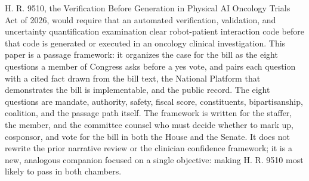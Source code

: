 H. R. 9510, the Verification Before Generation in Physical AI Oncology Trials Act
of 2026, would require that an automated verification, validation, and uncertainty
quantification examination clear robot-patient interaction code before that code is
generated or executed in an oncology clinical investigation. This paper is a
passage framework: it organizes the case for the bill as the eight questions a
member of Congress asks before a yes vote, and pairs each question with a cited
fact drawn from the bill text, the National Platform that demonstrates the bill is
implementable, and the public record. The eight questions are mandate, authority,
safety, fiscal score, constituents, bipartisanship, coalition, and the passage path
itself. The framework is written for the staffer, the member, and the committee
counsel who must decide whether to mark up, cosponsor, and vote for the bill in both
the House and the Senate. It does not rewrite the prior narrative review or the
clinician confidence framework; it is a new, analogous companion focused on a single
objective: making H. R. 9510 most likely to pass in both chambers.
